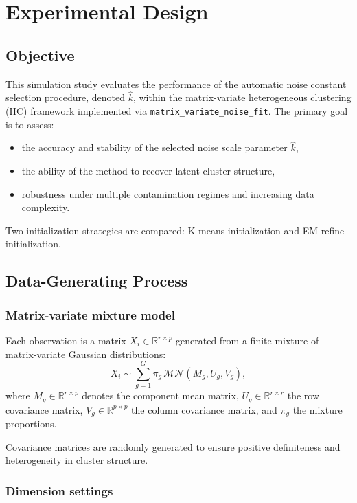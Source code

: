 \documentclass[11pt]{article}
\begin{document}
\section{Experimental Design}

\subsection{Objective}

This simulation study evaluates the performance of the automatic noise constant selection procedure, denoted $\hat{k}$, within the matrix-variate heterogeneous clustering (HC) framework implemented via \texttt{matrix\_variate\_noise\_fit}. The primary goal is to assess:

\begin{itemize}
    \item the accuracy and stability of the selected noise scale parameter $\hat{k}$,
    \item the ability of the method to recover latent cluster structure,
    \item robustness under multiple contamination regimes and increasing data complexity.
\end{itemize}

Two initialization strategies are compared: K-means initialization and EM-refine initialization.

\subsection{Data-Generating Process}

\subsubsection{Matrix-variate mixture model}

Each observation is a matrix $X_i \in \mathbb{R}^{r \times p}$ generated from a finite mixture of matrix-variate Gaussian distributions:
\[
X_i \sim \sum_{g=1}^{G} \pi_g \, \mathcal{MN}(M_g, U_g, V_g),
\]
where $M_g \in \mathbb{R}^{r \times p}$ denotes the component mean matrix, $U_g \in \mathbb{R}^{r \times r}$ the row covariance matrix, $V_g \in \mathbb{R}^{p \times p}$ the column covariance matrix, and $\pi_g$ the mixture proportions.

Covariance matrices are randomly generated to ensure positive definiteness and heterogeneity in cluster structure.

\subsubsection{Dimension settings}
\end{document}
